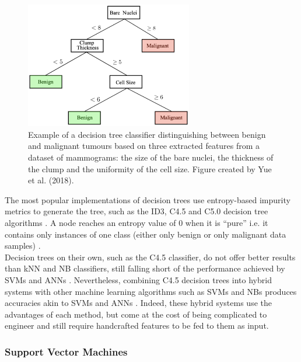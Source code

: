 \begin{figure}[ht]
\centerline{\includegraphics[width=0.65\textwidth]{Dissertation/figures/litsurvey/dt.png}}
\caption{\label{fig:litsurvey-dt-example}Example of a decision tree classifier distinguishing between benign and malignant tumours based on three extracted features from a dataset of mammograms: the size of the bare nuclei, the thickness of the clump and the uniformity of the cell size. Figure created by Yue et al. (2018).}
\end{figure}

The most popular implementations of decision trees use entropy-based impurity metrics to generate the tree, such as the ID3, C4.5 and C5.0 decision tree algorithms \cite{Yue2018}. A node reaches an entropy value of 0 when it is ``pure'' i.e. it contains only instances of one class (either only benign or only malignant data samples) \cite{Geron2019}.\\

Decision trees on their own, such as the C4.5 classifier, do not offer better results than kNN and NB classifiers, still falling short of the performance achieved by SVMs \cite{Asri2016} and ANNs \cite{Yue2018}. Nevertheless, combining C4.5 decision trees into hybrid systems with other machine learning algorithms such as SVMs and NBs produces accuracies akin to SVMs and ANNs \cite{Yue2018}. Indeed, these hybrid systems use the advantages of each method, but come at the cost of being complicated to engineer and still require handcrafted features to be fed to them as input.

\subsubsection{Support Vector Machines}

